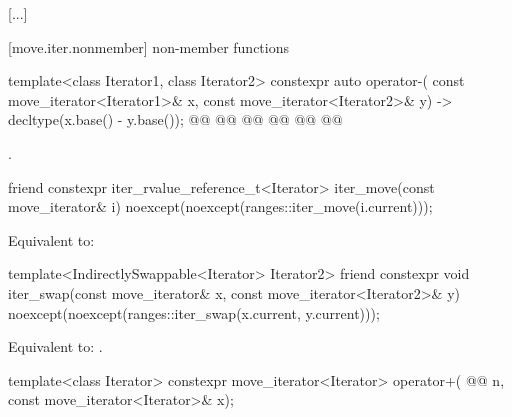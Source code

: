 [...]

[move.iter.nonmember]{ non-member functions}

\pnum
{}

%
\begin{itemdecl}
template<class Iterator1, class Iterator2>
  constexpr auto operator-(
    const move_iterator<Iterator1>& x,
    const move_iterator<Iterator2>& y) -> decltype(x.base() - y.base());
@@
@@
    @@
@@
@@
    @@
\end{itemdecl}

\begin{itemdescr}
\pnum
\returns {}.
\end{itemdescr}

{\color{newclr}
%
\begin{itemdecl}
friend constexpr iter_rvalue_reference_t<Iterator> iter_move(const move_iterator& i)
  noexcept(noexcept(ranges::iter_move(i.current)));
\end{itemdecl}

\begin{itemdescr}
\pnum
\effects Equivalent to: 
\end{itemdescr}

%
\begin{itemdecl}
template<IndirectlySwappable<Iterator> Iterator2>
  friend constexpr void iter_swap(const move_iterator& x, const move_iterator<Iterator2>& y)
    noexcept(noexcept(ranges::iter_swap(x.current, y.current)));
\end{itemdecl}

\begin{itemdescr}
\pnum
\effects Equivalent to: .
\end{itemdescr}
} %

%
\begin{itemdecl}
template<class Iterator>
  constexpr move_iterator<Iterator> operator+(
    @@ n,
    const move_iterator<Iterator>& x);
\end{itemdecl}

